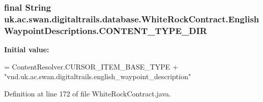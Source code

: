 \hypertarget{classuk_1_1ac_1_1swan_1_1digitaltrails_1_1database_1_1_white_rock_contract_1_1_english_waypoint_descriptions_ab7a08b8fb571368223c6d9faf5bf28ce}{
\subsubsection[{C\+O\+N\+T\+E\+N\+T\+\_\+\+T\+Y\+P\+E\+\_\+\+D\+I\+R}]{\setlength{\rightskip}{0pt plus 5cm}final String uk.\+ac.\+swan.\+digitaltrails.\+database.\+White\+Rock\+Contract.\+English\+Waypoint\+Descriptions.\+C\+O\+N\+T\+E\+N\+T\+\_\+\+T\+Y\+P\+E\+\_\+\+D\+I\+R\hspace{0.3cm}{\ttfamily [static]}}}\label{classuk_1_1ac_1_1swan_1_1digitaltrails_1_1database_1_1_white_rock_contract_1_1_english_waypoint_descriptions_ab7a08b8fb571368223c6d9faf5bf28ce}
{\bfseries Initial value\+:}
\begin{DoxyCode}
= ContentResolver.CURSOR\_ITEM\_BASE\_TYPE +
                \textcolor{stringliteral}{"vnd.uk.ac.swan.digitaltrails.english\_waypoint\_description"}
\end{DoxyCode}


Definition at line 172 of file White\+Rock\+Contract.\+java.


